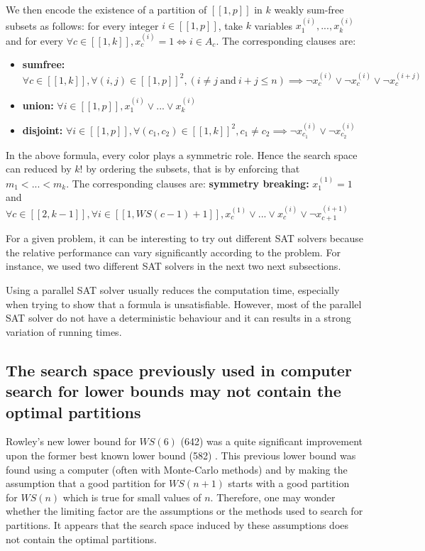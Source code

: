 We then encode the existence of a partition of \([\![1,p]\!]\) in \(k\) weakly sum-free subsets as follows: for every
integer
\(i \in [\![1,p]\!]\), take \(k\) variables \(x^{(i)}_{1}, ..., x^{(i)}_{k}\) and for every \(\forall c \in [\![1,k]\!],
x^{(i)}_c = 1 \iff i \in A_c\).
The corresponding clauses are:

\begin{itemize}
\item \textbf{sumfree:} \(\forall c \in [\![1,k]\!], \forall (i, j) \in [\![1,p]\!]^2, (i \neq j ~ \text{and} ~ i + j
\leq n) \implies \lnot x^{(i)}_c
\lor  \lnot x^{(i)}_c \lor \lnot x^{(i+j)}_c\)
\item \textbf{union:} \(\forall i \in [\![1,p]\!], x^{(i)}_1 \lor ... \lor x^{(i)}_k\)
\item \textbf{disjoint:} \(\forall i \in [\![1,p]\!],\forall (c_1, c_2) \in [\![1,k]\!]^2, c_1 \neq c_2 \implies \neg
x^{(i)}_{c_1} \lor \neg x^{(i)}_{c_2}\)
\end{itemize}

In the above formula, every color plays a symmetric role. Hence the search space can reduced by \(k!\) by ordering the
subsets, that is by
enforcing that \(m_1 < ... < m_k\). The corresponding clauses are: \linebreak
\textbf{symmetry breaking:} \(x^{(1)}_1 = 1\) and \(\forall c \in [\![2,k-1]\!], \forall i \in [\![1,WS(c - 1)+1]\!],
x^{(1)}_c \lor ... \lor x^{(i)}_c \lor \neg x^{(i+1)}_{c+1}\)

\begin{remark}
For a given problem, it can be interesting to try out different SAT solvers because the relative performance can vary
significantly according to the problem.
For instance, we used two different SAT solvers in the next two next subsections.
\end{remark}

\begin{remark}
Using a parallel SAT solver usually reduces the computation time, especially when trying to show that a formula is
unsatisfiable. However, most of the
parallel SAT solver do not have a deterministic behaviour and it can results in a strong variation of running times.
\end{remark}


\subsection{The search space previously used in computer search for lower bounds may not contain the optimal partitions}
Rowley's new lower bound for \(WS(6)\) (642) \cite{RowleyWS} was a quite significant improvement upon
the former
best known lower bound (582) \cite{EliahouBook}. This previous lower bound was found using a computer
(often with Monte-Carlo methods) and by making the
assumption that a good partition for \(WS(n+1)\) starts with a good partition for \(WS(n)\) which is true for small
values of \(n\).
Therefore, one may wonder whether the limiting factor are the assumptions or the methods used to search for partitions.
It appears that the search space
induced by these assumptions does not contain the optimal partitions.

